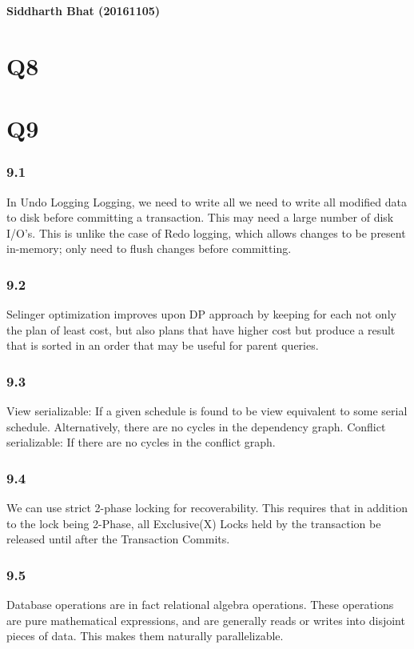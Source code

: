 \documentclass{article}
\begin{document}
\textbf{Siddharth Bhat (20161105)}
\section{Q8}
\section{Q9}
\subsubsection{9.1}
In Undo Logging Logging, we need to write all we need to write all modified
data to disk before committing a transaction.  This may need a large number of disk
I/O’s. This is unlike the case of Redo logging, which allows changes to be
present in-memory; only need to flush changes before committing.

\subsubsection{9.2}
Selinger optimization improves upon DP approach by keeping for
each  not only the plan of least cost, but also plans that have higher
cost but produce a result that is sorted in an order that may
be useful for parent queries.
\subsubsection{9.3}

View serializable: If a given schedule is found to be view equivalent to some serial schedule. Alternatively,
  there are no cycles in the dependency graph.
Conflict serializable: If there are no cycles in the conflict graph.


\subsubsection{9.4}

We can use strict 2-phase locking for recoverability. This requires that
in addition to the lock being 2-Phase, all Exclusive(X) Locks held by the
transaction be released until after the Transaction Commits.

\subsubsection{9.5}
Database operations are in fact relational algebra operations. These
operations are pure mathematical expressions, and are generally reads or
writes into disjoint pieces of data. This makes them naturally parallelizable.
\end{document}
